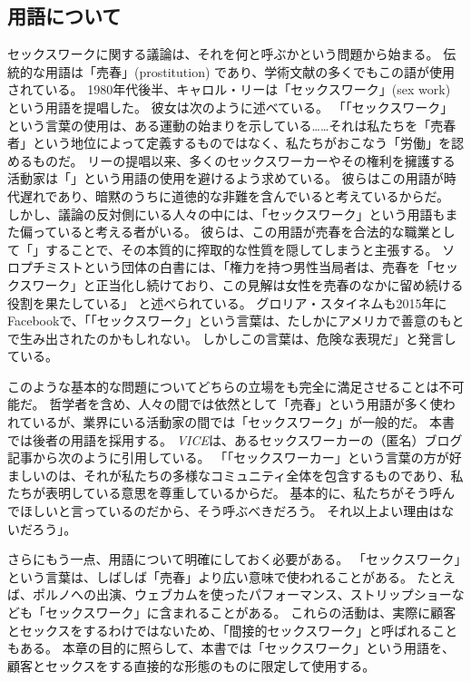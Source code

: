 \documentclass[paper=a4,book,openany]{jlreq}
\begin{document}
\subsection{用語について}

セックスワークに関する議論は、それを何と呼ぶかという問題から始まる。
伝統的な用語は「売春」(prostitution) であり、学術文献の多くでもこの語が使用されている。
1980年代後半、キャロル・リーは「セックスワーク」(sex work) という用語を提唱した。
彼女は次のように述べている。
「「セックスワーク」という言葉の使用は、ある運動の始まりを示している……それは私たちを「売春者」という地位によって定義するものではなく、私たちがおこなう「労働」を認めるものだ\citep[p.230]{leigh97:_inven_sex_work}。
リーの提唱以来、多くのセックスワーカーやその権利を擁護する活動家は「」という用語の使用を避けるよう求めている。
彼らはこの用語が時代遅れであり、暗黙のうちに道徳的な非難を含んでいると考えているからだ。
しかし、議論の反対側にいる人々の中には、「セックスワーク」という用語もまた偏っていると考える者がいる。
彼らは、この用語が売春を合法的な職業として「」することで、その本質的に搾取的な性質を隠してしまうと主張する。
ソロプチミストという団体の白書には、「権力を持つ男性当局者は、売春を「セックスワーク」と正当化し続けており、この見解は女性を売春のなかに留め続ける役割を果たしている」
と述べられている\citep{soroptimist17:_prost_is_not_choic}。
グロリア・スタイネムも2015年にFacebookで、「「セックスワーク」という言葉は、たしかにアメリカで善意のもとで生み出されたのかもしれない。
しかしこの言葉は、危険な表現だ」と発言している\citep{steinem15:_faceb}。

このような基本的な問題についてどちらの立場をも完全に満足させることは不可能だ。
哲学者を含め、人々の間では依然として「売春」という用語が多く使われているが、業界にいる活動家の間では「セックスワーク」が一般的だ。
本書では後者の用語を採用する。
\emph{VICE}は、あるセックスワーカーの（匿名）ブログ記事から次のように引用している。
「「セックスワーカー」という言葉の方が好ましいのは、それが私たちの多様なコミュニティ全体を包含するものであり、私たちが表明している意思を尊重しているからだ。
基本的に、私たちがそう呼んでほしいと言っているのだから、そう呼ぶべきだろう。
それ以上よい理由はないだろう」\citep{ratchford13:_why_is_canad_media_still}。

さらにもう一点、用語について明確にしておく必要がある。
「セックスワーク」という言葉は、しばしば「売春」より広い意味で使われることがある。
たとえば、ポルノへの出演、ウェブカムを使ったパフォーマンス、ストリップショーなども「セックスワーク」に含まれることがある。
これらの活動は、実際に顧客とセックスをするわけではないため、「間接的セックスワーク」と呼ばれることもある。
本章の目的に照らして、本書では「セックスワーク」という用語を、顧客とセックスをする直接的な形態のものに限定して使用する。
\end{document}
